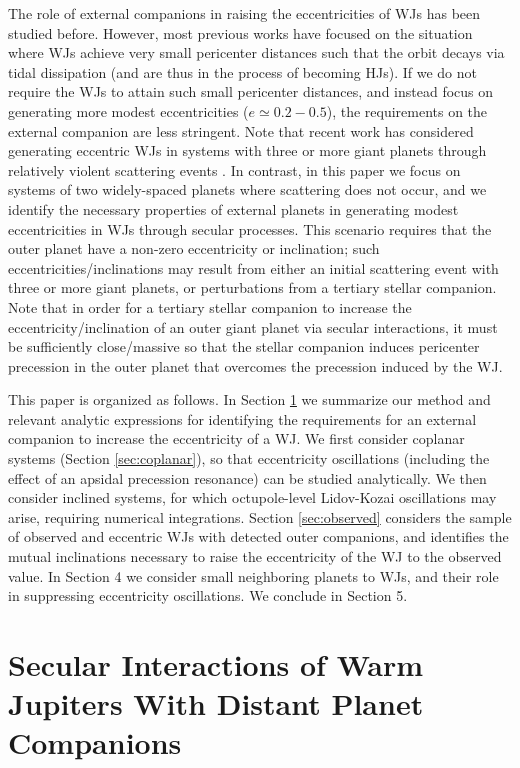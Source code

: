 \documentclass[12pt,useAMS, usenatbib]{mn2e}
\begin{document}
The role of external companions in raising the eccentricities of WJs has been studied before.  However, most previous works \citep[e.g.][]{dong2014,dawson2014,antonini2016, petrovich2016} have focused on the situation where WJs achieve very small pericenter distances such that the orbit decays via tidal dissipation (and are thus in the process of becoming HJs).  If we do not require the WJs to attain such small pericenter distances, and instead focus on generating more modest eccentricities ($e \simeq 0.2 - 0.5$), the requirements on the external companion are less stringent.  Note that recent work has considered generating eccentric WJs in systems with three or more giant planets through relatively violent scattering events \citep{mustill2016}.  In contrast, in this paper we focus on systems of two widely-spaced planets where scattering does not occur, and we identify the necessary properties of external planets in generating modest eccentricities in WJs through secular processes.  This scenario requires that the outer planet have a non-zero eccentricity or inclination; such eccentricities/inclinations may result from either an initial scattering event with three or more giant planets, or perturbations from a tertiary stellar companion. Note that in order for a tertiary stellar companion to increase the eccentricity/inclination of an outer giant planet via secular interactions, it must be sufficiently close/massive so that the stellar companion induces pericenter precession in the outer planet that overcomes the precession induced by the WJ.

This paper is organized as follows. In Section \ref{sec:fiducial} we summarize our method and relevant analytic expressions for identifying the requirements for an external companion to increase the eccentricity of a WJ.  We first consider coplanar systems (Section \ref{sec:coplanar}), so that eccentricity oscillations (including the effect of an apsidal precession resonance) can be studied analytically.  We then consider inclined systems, for which octupole-level Lidov-Kozai oscillations may arise, requiring numerical integrations. Section \ref{sec:observed} considers the sample of observed and eccentric WJs with detected outer companions, and identifies the mutual inclinations necessary to raise the eccentricity of the WJ to the observed value.  In Section 4 we consider small neighboring planets to WJs, and their role in suppressing eccentricity oscillations.  We conclude in Section 5.   

\section{Secular Interactions of Warm Jupiters With Distant Planet Companions}
\label{sec:fiducial}
\end{document}
